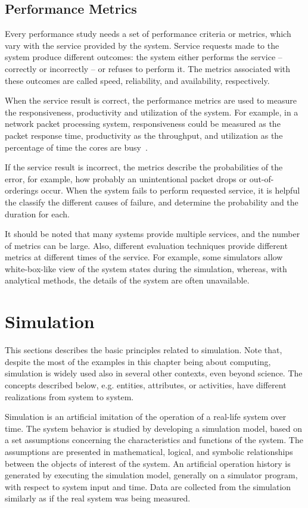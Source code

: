 \subsection{Performance Metrics}
Every performance study needs a set of performance criteria or metrics, which vary with the service provided by the system. Service requests made to the system produce different outcomes: the system either performs the service -- correctly or incorrectly -- or refuses to perform it. The metrics associated with these outcomes are called speed, reliability, and availability, respectively.~\cite{jain:1991:AOCSPA}

When the service result is correct, the performance metrics are used to measure the responsiveness, productivity and utilization of the system. For example, in a network packet processing system, responsiveness could be measured as the packet response time, productivity as the throughput, and utilization as the percentage of time the cores are busy~\cite{cavium:2010:fundamentals}.~\cite{jain:1991:AOCSPA}

If the service result is incorrect, the metrics describe the probabilities of the error, for example, how probably an unintentional packet drops or out-of-orderings occur. When the system fails to perform requested service, it is helpful the classify the different causes of failure, and determine the probability and the duration for each.~\cite{jain:1991:AOCSPA}

It should be noted that many systems provide multiple services, and the number of metrics can be large. Also, different evaluation techniques provide different metrics at different times of the service. For example, some simulators allow white-box-like view of the system states during the simulation, whereas, with analytical methods, the details of the system are often unavailable.~\cite{jain:1991:AOCSPA}

\section{Simulation}
This sections describes the basic principles related to simulation. Note that, despite the most of the examples in this chapter being about computing, simulation is widely used also in several other contexts, even beyond science. The concepts described below, e.g. entities, attributes, or activities, have different realizations from system to system.

Simulation is an artificial imitation of the operation of a real-life system over time. The system behavior is studied by developing a simulation model, based on a set assumptions concerning the characteristics and functions of the system. The assumptions are presented in mathematical, logical, and symbolic relationships between the objects of interest of the system. An artificial operation history is generated by executing the simulation model, generally on a simulator program, with respect to system input and time. Data are collected from the simulation similarly as if the real system was being measured.

